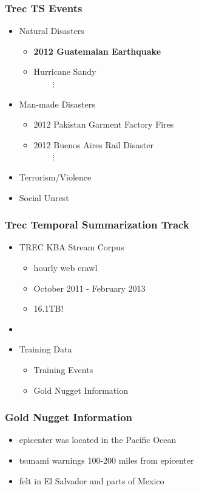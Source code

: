 \documentclass{beamer}
\begin{document}
\begin{frame}
\frametitle{Trec TS Events}
\begin{itemize}
    \item{Natural Disasters}
        \begin{itemize}
            \item{\textbf{2012 Guatemalan Earthquake}}
            \item{Hurricane Sandy\\}
            $\;\;\;\;\;\;\;\;\vdots$
        \end{itemize}
    \item{Man-made Disasters}
        \begin{itemize}
            \item{2012 Pakistan Garment Factory Fires}
            \item{2012 Buenos Aires Rail Disaster\\}
            $\;\;\;\;\;\;\;\;\vdots$
        \end{itemize}
    \item{Terrorism/Violence}
    \item{Social Unrest}
\end{itemize}
\end{frame}

\begin{frame}
\frametitle{Trec Temporal Summarization Track}
\begin{itemize}
\item TREC KBA Stream Corpus
\begin{itemize}
\item hourly web crawl
\item October 2011 - February 2013
\item 16.1TB!
\end{itemize}
\item[]
\item Training Data
\begin{itemize}
\item Training Events
\pause
\item Gold Nugget Information
\end{itemize}
\end{itemize}
\end{frame}


\begin{frame}
\frametitle{Gold Nugget Information}
\begin{itemize}
\item epicenter was located in the Pacific Ocean 
\item tsunami warnings 100-200 miles from epicenter
\item felt in El Salvador and parts of Mexico
\end{itemize}
\end{frame}
\end{document}
